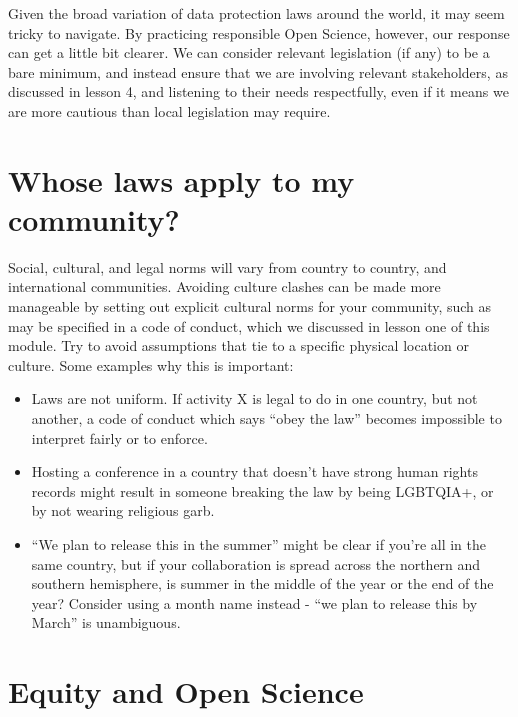 \documentclass[
  letterpaper,
  DIV=11,
  numbers=noendperiod]{scrreport}
\providecommand{\tightlist}{%
  \setlength{\itemsep}{0pt}\setlength{\parskip}{0pt}}\usepackage{longtable,booktabs,array}
\begin{document}
Given the broad variation of data protection laws around the world, it
may seem tricky to navigate. By practicing responsible Open Science,
however, our response can get a little bit clearer. We can consider
relevant legislation (if any) to be a bare minimum, and instead ensure
that we are involving relevant stakeholders, as discussed in lesson 4,
and listening to their needs respectfully, even if it means we are more
cautious than local legislation may require.

\hypertarget{whose-laws-apply-to-my-community}{%
\section{Whose laws apply to my
community?}\label{whose-laws-apply-to-my-community}}

Social, cultural, and legal norms will vary from country to country, and
international communities. Avoiding culture clashes can be made more
manageable by setting out explicit cultural norms for your community,
such as may be specified in a code of conduct, which we discussed in
lesson one of this module. Try to avoid assumptions that tie to a
specific physical location or culture. Some examples why this is
important:

\begin{itemize}
\tightlist
\item
  Laws are not uniform. If activity X is legal to do in one country, but
  not another, a code of conduct which says ``obey the law'' becomes
  impossible to interpret fairly or to enforce.
\item
  Hosting a conference in a country that doesn't have strong human
  rights records might result in someone breaking the law by being
  LGBTQIA+, or by not wearing religious garb.
\item
  ``We plan to release this in the summer'' might be clear if you're all
  in the same country, but if your collaboration is spread across the
  northern and southern hemisphere, is summer in the middle of the year
  or the end of the year? Consider using a month name instead - ``we
  plan to release this by March'' is unambiguous.
\end{itemize}

\hypertarget{equity-and-open-science}{%
\section{Equity and Open Science}\label{equity-and-open-science}}
\end{document}
